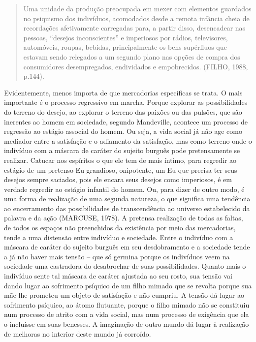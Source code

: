 \begin{quote}
Uma unidade da produção preocupada em mexer com elementos guardados no
psiquismo dos indivíduos, acomodados desde a remota infância cheia de
recordações afetivamente carregadas para, a partir disso, desencadear
nas pessoas, ``desejos inconscientes'' e imperiosos por rádios,
televisores, automóveis, roupas, bebidas, principalmente os bens
supérfluos que estavam sendo relegados a um segundo plano nas opções de
compra dos consumidores desempregados, endividados e empobrecidos.
(FILHO, 1988, p.144).
\end{quote}

Evidentemente, menos importa de que mercadorias específicas se trata. O
mais importante é o processo regressivo em marcha. Porque explorar as
possibilidades do terreno do desejo, ao explorar o terreno das paixões
ou das pulsões, que são inerentes ao homem em sociedade, segundo
Mandeville, acontece um processo de regressão ao estágio associal do
homem. Ou seja, a vida social já não age como mediador entre a
satisfação e o adiamento da satisfação, mas como terreno onde o
indivíduo com a máscara de caráter do sujeito burguês pode pretensamente
se realizar. Catucar nos espíritos o que ele tem de mais íntimo, para
regredir ao estágio de um pretenso Eu-grandioso, onipotente, um Eu que
precisa ter seus desejos sempre saciados, pois ele encara seus desejos
como imperiosos, é em verdade regredir ao estágio infantil do homem. Ou,
para dizer de outro modo, é uma forma de realização de uma segunda
natureza, o que significa uma tendência ao encerramento das
possibilidades de transcendência ao universo estabelecido da palavra e
da ação (MARCUSE, 1978). A pretensa realização de todas as faltas, de
todos os espaços não preenchidos da existência por meio das mercadorias,
tende a uma distensão entre indivíduo e sociedade. Entre o indivíduo com
a máscara de caráter do sujeito burguês em seu desdobramento e a
sociedade tende a já não haver mais tensão -- que só germina porque os
indivíduos veem na sociedade uma castradora do desabrochar de suas
possibilidades. Quanto mais o indivíduo sente tal máscara de caráter
ajustada ao seu rosto, sua tensão vai dando lugar ao sofrimento psíquico
de um filho mimado que se revolta porque sua mãe lhe prometeu um objeto
de satisfação e não cumpriu. A tensão dá lugar ao sofrimento psíquico,
ao átomo flutuante, porque o filho mimado não se constituiu num processo
de atrito com a vida social, mas num processo de exigência que ela o
incluísse em suas benesses. A imaginação de outro mundo dá lugar à
realização de melhoras no interior deste mundo já corroído.

